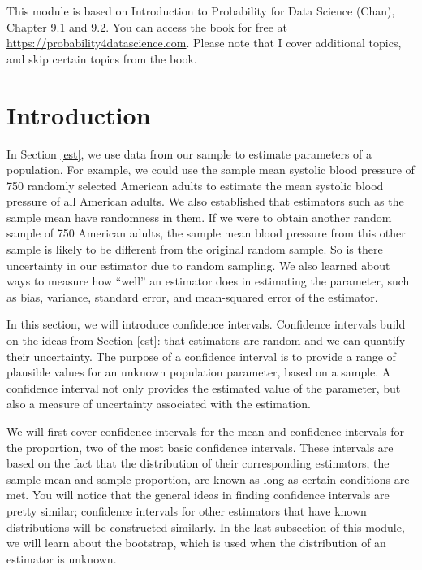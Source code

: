 \documentclass[
]{book}
\begin{document}
This module is based on Introduction to Probability for Data Science (Chan), Chapter 9.1 and 9.2. You can access the book for free at \url{https://probability4datascience.com}. Please note that I cover additional topics, and skip certain topics from the book.

\hypertarget{introduction-4}{%
\section{Introduction}\label{introduction-4}}

In Section \ref{est}, we use data from our sample to estimate parameters of a population. For example, we could use the sample mean systolic blood pressure of 750 randomly selected American adults to estimate the mean systolic blood pressure of all American adults. We also established that estimators such as the sample mean have randomness in them. If we were to obtain another random sample of 750 American adults, the sample mean blood pressure from this other sample is likely to be different from the original random sample. So is there uncertainty in our estimator due to random sampling. We also learned about ways to measure how ``well'' an estimator does in estimating the parameter, such as bias, variance, standard error, and mean-squared error of the estimator.

In this section, we will introduce confidence intervals. Confidence intervals build on the ideas from Section \ref{est}: that estimators are random and we can quantify their uncertainty. The purpose of a confidence interval is to provide a range of plausible values for an unknown population parameter, based on a sample. A confidence interval not only provides the estimated value of the parameter, but also a measure of uncertainty associated with the estimation.

We will first cover confidence intervals for the mean and confidence intervals for the proportion, two of the most basic confidence intervals. These intervals are based on the fact that the distribution of their corresponding estimators, the sample mean and sample proportion, are known as long as certain conditions are met. You will notice that the general ideas in finding confidence intervals are pretty similar; confidence intervals for other estimators that have known distributions will be constructed similarly. In the last subsection of this module, we will learn about the bootstrap, which is used when the distribution of an estimator is unknown.
\end{document}

